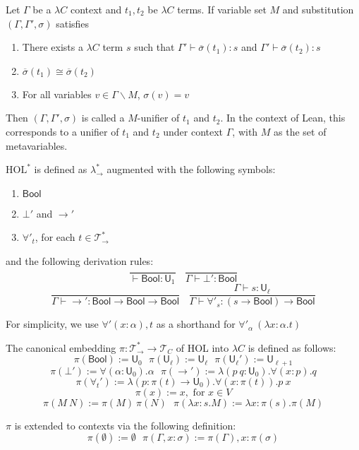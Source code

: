 \begin{definition} Let $\Gamma$ be a $\lambda C$ context and $t_1, t_2$ be $\lambda C$ terms.
  If variable set $M$ and substitution $(\Gamma, \Gamma', \sigma)$ satisfies
  \begin{enumerate}
    \item There exists a $\lambda C$ term $s$ such that $\Gamma' \vdash \overline{\sigma}(t_1) : s$ and $\Gamma' \vdash \overline{\sigma}(t_2) : s$
    \item $\overline{\sigma}(t_1) \cong \overline{\sigma}(t_2)$
    \item For all variables $v \in \Gamma \backslash M$, $\sigma(v) = v$
  \end{enumerate}
  Then $(\Gamma, \Gamma', \sigma)$ is called a $M$-unifier of $t_1$ and $t_2$. In the context of Lean,
  this corresponds to a unifier of $t_1$ and $t_2$ under context $\Gamma$, with $M$ as the set of metavariables.
\end{definition}

\begin{definition} $\text{HOL}^*$ is defined as $\lambda_\to^*$ augmented with the following symbols:
  \begin{enumerate}
    \item $\mathsf{Bool}$
    \item $\bot'$ and $\to'$
    \item $\forall'_t$, for each $t \in \mathcal{T}_\to^*$
  \end{enumerate}
  
  \noindent and the following derivation rules:
  $$\frac{}{\vdash \mathsf{Bool} : \mathsf{U}_1} \ \ \ \ \frac{}{\Gamma \vdash \bot' : \mathsf{Bool}}$$
  $$\frac{}{\Gamma \vdash \to' : \mathsf{Bool} \to \mathsf{Bool} \to \mathsf{Bool}} \ \ \ \
  \frac{\Gamma \vdash s : \mathsf{U}_\ell}{\Gamma \vdash \forall'_s : (s \to \mathsf{Bool}) \to \mathsf{Bool}}$$
  
  \noindent For simplicity, we use $\forall' (x : \alpha), t$ as a shorthand for $\forall'_\alpha \ (\lambda x : \alpha. t)$

  The canonical embedding $\pi : \mathcal{T}_\to^* \to \mathcal{T}_C$ of HOL into $\lambda C$ is defined as follows:
  $$\pi(\mathsf{Bool}) := \mathsf{U}_0 \ \ \ \pi(\mathsf{U}_\ell) := \mathsf{U}_\ell \ \ \
    \pi(\mathsf{U}_\ell') := \mathsf{U}_{\ell + 1}$$
  $$\pi(\bot') := \forall (\alpha : \mathsf{U}_0). \alpha \ \ \
  \pi(\to') := \lambda (p \ q : \mathsf{U}_0). \forall (x : p). q$$
  $$\pi(\forall_t') := \lambda (p : \pi(t) \to \mathsf{U}_0). \forall (x : \pi(t)). p \ x$$
  $$\pi(x) := x, \text{ for } x \in V$$
  $$\pi(M \ N) := \pi(M) \ \pi(N) \ \ \ \pi(\lambda x : s. M) := \lambda x : \pi(s). \pi(M)$$

  \noindent $\pi$ is extended to contexts via the following definition:
  $$\pi(\emptyset) := \emptyset \ \ \ \pi(\Gamma, x : \sigma) := \pi(\Gamma), x : \pi(\sigma)$$


\end{definition}

